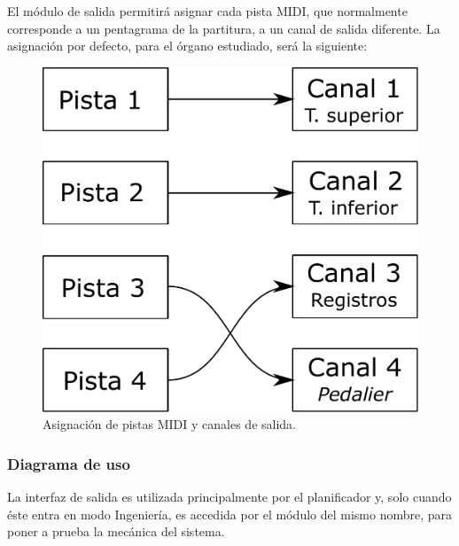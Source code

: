 El módulo de salida permitirá asignar cada pista \acrshort{MIDI}, que normalmente corresponde a un pentagrama de la partitura, a un canal de salida diferente. La asignación por defecto, para el órgano estudiado, será la siguiente:

\smallskip

\begin{figure}[H]
	\noindent \begin{centering}
		\includegraphics[width=\linewidth/3]{capitulo4/map}
		\par\end{centering}
	\smallskip
	\caption{\label{fig:map} Asignación de pistas MIDI y canales de salida.}
\end{figure} 

\smallskip

\subsubsection{Diagrama de uso}

La interfaz de salida es utilizada principalmente por el planificador y, solo cuando éste entra en modo Ingeniería, es accedida por el módulo del mismo nombre, para poner a prueba la mecánica del sistema.

\smallskip

